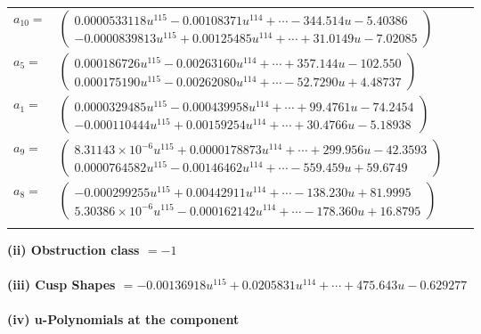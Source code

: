 \documentclass[1p]{elsarticle_modified}
\theoremstyle{definition}
\begin{document}
\begin{tabular}{m{7pt} m{180pt} m{7pt} m{180pt} }
\flushright $a_{10}=$&$\begin{pmatrix}0.0000533118 u^{115}-0.00108371 u^{114}+\cdots-344.514 u-5.40386\\-0.0000839813 u^{115}+0.00125485 u^{114}+\cdots+31.0149 u-7.02085\end{pmatrix}$ \\
\flushright $a_{5}=$&$\begin{pmatrix}0.000186726 u^{115}-0.00263160 u^{114}+\cdots+357.144 u-102.550\\0.000175190 u^{115}-0.00262080 u^{114}+\cdots-52.7290 u+4.48737\end{pmatrix}$ \\
\flushright $a_{1}=$&$\begin{pmatrix}0.0000329485 u^{115}-0.000439958 u^{114}+\cdots+99.4761 u-74.2454\\-0.000110444 u^{115}+0.00159254 u^{114}+\cdots+30.4766 u-5.18938\end{pmatrix}$ \\
\flushright $a_{9}=$&$\begin{pmatrix}8.31143\times10^{-6} u^{115}+0.0000178873 u^{114}+\cdots+299.956 u-42.3593\\0.0000764582 u^{115}-0.00146462 u^{114}+\cdots-559.459 u+59.6749\end{pmatrix}$ \\
\flushright $a_{8}=$&$\begin{pmatrix}-0.000299255 u^{115}+0.00442911 u^{114}+\cdots-138.230 u+81.9995\\5.30386\times10^{-6} u^{115}-0.000162142 u^{114}+\cdots-178.360 u+16.8795\end{pmatrix}$\\&\end{tabular}
\flushleft \textbf{(ii) Obstruction class $= -1$}\\~\\
\flushleft \textbf{(iii) Cusp Shapes $= -0.00136918 u^{115}+0.0205831 u^{114}+\cdots+475.643 u-0.629277$}\\~\\
\newpage\renewcommand{\arraystretch}{1}
\flushleft \textbf{(iv) u-Polynomials at the component}\newline \\
\end{document}
